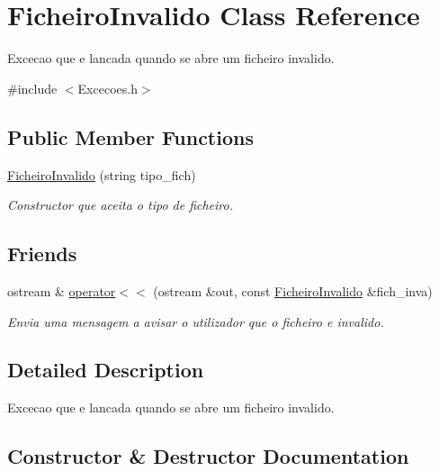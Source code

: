 \hypertarget{class_ficheiro_invalido}{}\section{Ficheiro\+Invalido Class Reference}
\label{class_ficheiro_invalido}


Excecao que e lancada quando se abre um ficheiro invalido.  




{\ttfamily \#include $<$Excecoes.\+h$>$}

\subsection*{Public Member Functions}
\begin{DoxyCompactItemize}
\item 
\hyperlink{class_ficheiro_invalido_a000f42e4f32d27943000605907240ee3}{Ficheiro\+Invalido} (string tipo\+\_\+fich)
\begin{DoxyCompactList}\small\item\em Constructor que aceita o tipo de ficheiro. \end{DoxyCompactList}\end{DoxyCompactItemize}
\subsection*{Friends}
\begin{DoxyCompactItemize}
\item 
ostream \& \hyperlink{class_ficheiro_invalido_a150983c019491c5ea124515a0d9845bd}{operator$<$$<$} (ostream \&out, const \hyperlink{class_ficheiro_invalido}{Ficheiro\+Invalido} \&fich\+\_\+inva)
\begin{DoxyCompactList}\small\item\em Envia uma mensagem a avisar o utilizador que o ficheiro e invalido. \end{DoxyCompactList}\end{DoxyCompactItemize}


\subsection{Detailed Description}
Excecao que e lancada quando se abre um ficheiro invalido. 

\subsection{Constructor \& Destructor Documentation}
\hypertarget{class_ficheiro_invalido_a000f42e4f32d27943000605907240ee3}{}\label{class_ficheiro_invalido_a000f42e4f32d27943000605907240ee3} 
